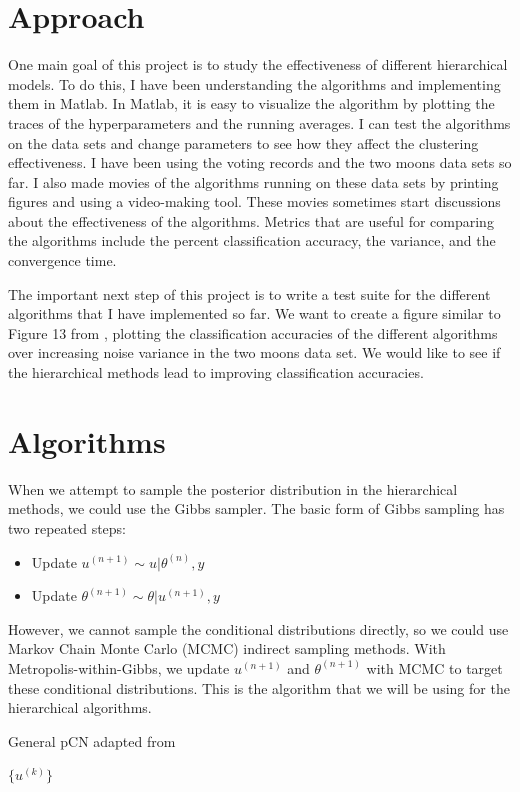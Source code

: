 \documentclass{siamart1116}
\begin{document}
\section{Approach}
One main goal of this project is to study the effectiveness of different hierarchical models. To do this, I have been understanding the algorithms and implementing them in Matlab. In Matlab, it is easy to visualize the algorithm by plotting the traces of the hyperparameters and the running averages. I can test the algorithms on the data sets and change parameters to see how they affect the clustering effectiveness. I have been using the voting records and the two moons data sets so far. I also made movies of the algorithms running on these data sets by printing figures and using a video-making tool. These movies sometimes start discussions about the effectiveness of the algorithms. Metrics that are useful for comparing the algorithms include the percent classification accuracy, the variance, and the convergence time.

The important next step of this project is to write a test suite for the different algorithms that I have implemented so far. We want to create a figure similar to Figure 13 from \cite{BeLuStZy17}, plotting the classification accuracies of the different algorithms over increasing noise variance in the two moons data set. We would like to see if the hierarchical methods lead to improving classification accuracies.

\section{Algorithms}
When we attempt to sample the posterior distribution in the hierarchical methods, we could use the Gibbs sampler. The basic form of Gibbs sampling has two repeated steps:
\begin{itemize}
\item Update $u^{(n+1)} \sim u|\theta^{(n)}, y$
\item Update $\theta^{(n+1)} \sim \theta|u^{(n+1)}, y$
\end{itemize}
However, we cannot sample the conditional distributions directly, so we could use Markov Chain Monte Carlo (MCMC) indirect sampling methods. With Metropolis-within-Gibbs, we update $u^{(n+1)}$ and $\theta^{(n+1)}$ with MCMC to target these conditional distributions. This is the algorithm that we will be using for the hierarchical algorithms.

\begin{algorithm}
\caption{General pCN adapted from \cite{CoRoStWh13}}
\label{alg:generalpCN}
\begin{algorithmic}
\EndFor
\State \Return $\{u^{(k)}\}$
\end{algorithmic}
\end{algorithm}
\end{document}
